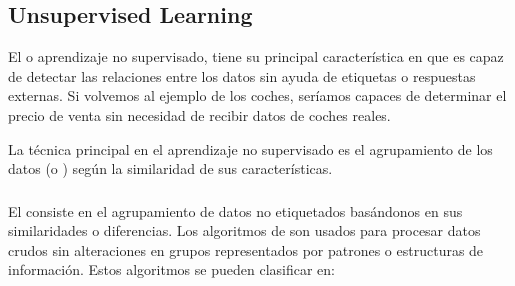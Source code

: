 

\subsection{Unsupervised Learning}

El  o  aprendizaje no supervisado, tiene su principal característica en que es capaz de detectar las relaciones entre los datos sin ayuda de etiquetas o respuestas externas. Si volvemos al ejemplo de los coches, seríamos capaces de determinar el precio de venta sin necesidad de recibir datos de coches reales.

La técnica principal en el aprendizaje no supervisado es el agrupamiento de los datos (o ) según la similaridad de sus características.

\subsubsection{}

El  consiste en el agrupamiento de datos no etiquetados basándonos en sus similaridades o diferencias. Los algoritmos de  son usados para procesar datos crudos sin alteraciones en grupos representados por patrones o estructuras de información. Estos algoritmos se pueden clasificar en:

